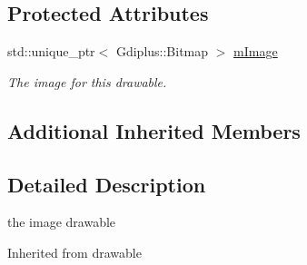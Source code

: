 \subsection*{Protected Attributes}
\begin{DoxyCompactItemize}
\item 
\hypertarget{class_c_image_drawable_ae55a012a4867007fc409db9d71476c71}{std\+::unique\+\_\+ptr$<$ Gdiplus\+::\+Bitmap $>$ \hyperlink{class_c_image_drawable_ae55a012a4867007fc409db9d71476c71}{m\+Image}}\label{class_c_image_drawable_ae55a012a4867007fc409db9d71476c71}

\begin{DoxyCompactList}\small\item\em The image for this drawable. \end{DoxyCompactList}\end{DoxyCompactItemize}
\subsection*{Additional Inherited Members}


\subsection{Detailed Description}
the image drawable

Inherited from drawable 

